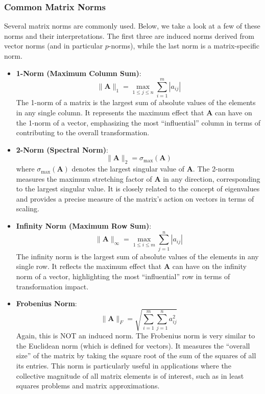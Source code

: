 \subsubsection{Common Matrix Norms}
Several matrix norms are commonly used. Below, we take a look at a few of these norms and their interpretations. The first three are induced norms derived from vector norms (and in particular $p$-norms), while the last norm is a matrix-specific norm.
\begin{itemize}
    \item \textbf{1-Norm (Maximum Column Sum)}:
    \begin{equation*}
        \|\mathbf{A}\|_1 = \max_{1 \leq j \leq n} \sum_{i=1}^m |a_{ij}|
    \end{equation*}
    The 1-norm of a matrix is the largest sum of absolute values of the elements in any single column. It represents the maximum effect that $ \mathbf{A} $ can have on the 1-norm of a vector, emphasizing the most  ``influential'' column in terms of contributing to the overall transformation.

    \item \textbf{2-Norm (Spectral Norm)}:
    \begin{equation*}
        \|\mathbf{A}\|_2 = \sigma_{\max}(\mathbf{A})
    \end{equation*}
    where $ \sigma_{\max}(\mathbf{A}) $ denotes the largest singular value of $ \mathbf{A} $. The 2-norm measures the maximum stretching factor of $ \mathbf{A} $ in any direction, corresponding to the largest singular value. It is closely related to the concept of eigenvalues and provides a precise measure of the matrix's action on vectors in terms of scaling.
    
    \item \textbf{Infinity Norm (Maximum Row Sum)}:
    \begin{equation*}
        \|\mathbf{A}\|_\infty = \max_{1 \leq i \leq m} \sum_{j=1}^n |a_{ij}|
    \end{equation*}
    The infinity norm is the largest sum of absolute values of the elements in any single row. It reflects the maximum effect that $ \mathbf{A} $ can have on the infinity norm of a vector, highlighting the most        ``influential'' row in terms of transformation impact.
    
    \item \textbf{Frobenius Norm}:
    \begin{equation*}
        \|\mathbf{A}\|_F = \sqrt{\sum_{i=1}^m \sum_{j=1}^n a_{ij}^2}
    \end{equation*}
    Again, this is NOT an induced norm. The Frobenius norm is very similar to the Euclidean norm (which is defined for vectors). It measures the ``overall size'' of the matrix by taking the square root of the sum of the squares of all its entries. This norm is particularly useful in applications where the collective magnitude of all matrix elements is of interest, such as in least squares problems and matrix approximations.
\end{itemize}

